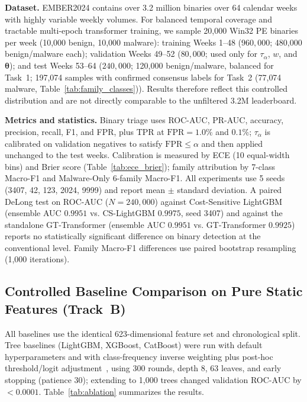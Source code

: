 \documentclass[Number]{sn-jnl}
\begin{document}
\noindent\textbf{Dataset.}
EMBER2024 contains over 3.2 million binaries over 64 calendar weeks with highly variable weekly volumes. For balanced temporal coverage and tractable multi-epoch transformer training, we sample 20{,}000 Win32 PE binaries per week (10{,}000 benign, 10{,}000 malware): training Weeks 1--48 ($960{,}000$; 480{,}000 benign/malware each); validation Weeks 49--52 ($80{,}000$; used only for $\tau_\alpha$, $w$, and $\boldsymbol{\theta}$); and test Weeks 53--64 ($240{,}000$; 120{,}000 benign/malware, balanced for Task~1; 197{,}074 samples with confirmed consensus labels for Task~2 (77{,}074 malware, Table~\ref{tab:family_classes})). Results therefore reflect this controlled distribution and are not directly comparable to the unfiltered 3.2M leaderboard.

\noindent\textbf{Metrics and statistics.}
Binary triage uses ROC-AUC, PR-AUC, accuracy, precision, recall, F1, and FPR, plus TPR at $\text{FPR}=1.0\%$ and $0.1\%$; $\tau_\alpha$ is calibrated on validation negatives to satisfy $\text{FPR}\le\alpha$ and then applied unchanged to the test weeks. Calibration is measured by ECE (10 equal-width bins) and Brier score (Table~\ref{tab:ece_brier}); family attribution by 7-class Macro-F1 and Malware-Only 6-family Macro-F1. All experiments use 5 seeds (3407, 42, 123, 2024, 9999) and report mean $\pm$ standard deviation. A paired DeLong test on ROC-AUC ($N=240{,}000$) against Cost-Sensitive LightGBM (ensemble AUC $0.9951$ vs. CS-LightGBM $0.9975$, seed 3407) and against the standalone GT-Transformer (ensemble AUC $0.9951$ vs. GT-Transformer $0.9925$) reports no statistically significant difference on binary detection at the conventional level. Family Macro-F1 differences use paired bootstrap resampling (1{,}000 iterations).

\subsection{Controlled Baseline Comparison on Pure Static Features (Track~B)}\label{subsec:controlled_comp}

All baselines use the identical 623-dimensional feature set and chronological split. Tree baselines (LightGBM, XGBoost, CatBoost) were run with default hyperparameters and with class-frequency inverse weighting plus post-hoc threshold/logit adjustment~\cite{elkan2001foundations,zadrozny2001obtaining}, using 300 rounds, depth 8, 63 leaves, and early stopping (patience 30); extending to 1{,}000 trees changed validation ROC-AUC by $<0.0001$. Table~\ref{tab:ablation} summarizes the results.
\end{document}
